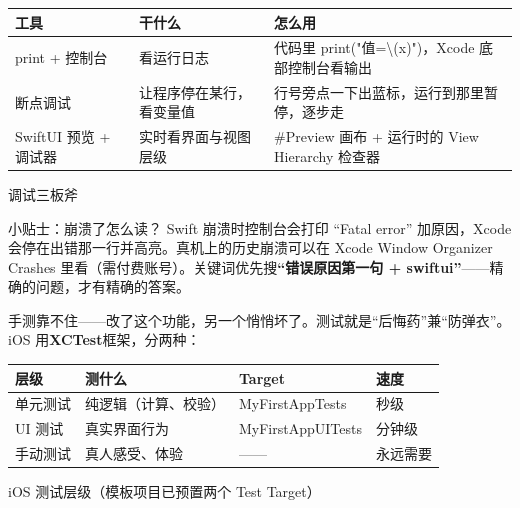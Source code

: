 


\begin{center}
\begin{tabularx}{\linewidth}{|X|X|X|}
\hline
\textbf{工具} & \textbf{干什么} & \textbf{怎么用} \tabularnewline
\hline
print + 控制台 & 看运行日志 & 代码里 print("值=\textbackslash{}(x)")，Xcode 底部控制台看输出 \tabularnewline
断点调试 & 让程序停在某行，看变量值 & 行号旁点一下出蓝标，运行到那里暂停，逐步走 \tabularnewline
SwiftUI 预览 + 调试器 & 实时看界面与视图层级 & \#Preview 画布 + 运行时的 View Hierarchy 检查器 \tabularnewline
\hline
\end{tabularx}
\end{center}

\begin{center}\small\color{gray}调试三板斧\end{center}

\begin{tcbinfo}{小贴士：崩溃了怎么读？}
Swift 崩溃时控制台会打印 “Fatal error” 加原因，Xcode 会停在出错那一行并高亮。真机上的历史崩溃可以在 Xcode Window Organizer Crashes 里看（需付费账号）。关键词优先搜\textbf{“错误原因第一句 + swiftui”}——精确的问题，才有精确的答案。

\end{tcbinfo}


手测靠不住——改了这个功能，另一个悄悄坏了。测试就是“后悔药”兼“防弹衣”。iOS 用\textbf{XCTest}框架，分两种：

\begin{center}
\begin{tabularx}{\linewidth}{|X|X|X|X|}
\hline
\textbf{层级} & \textbf{测什么} & \textbf{Target} & \textbf{速度} \tabularnewline
\hline
单元测试 & 纯逻辑（计算、校验） & MyFirstAppTests & 秒级 \tabularnewline
UI 测试 & 真实界面行为 & MyFirstAppUITests & 分钟级 \tabularnewline
手动测试 & 真人感受、体验 & —— & 永远需要 \tabularnewline
\hline
\end{tabularx}
\end{center}

\begin{center}\small\color{gray}iOS 测试层级（模板项目已预置两个 Test Target）\end{center}


